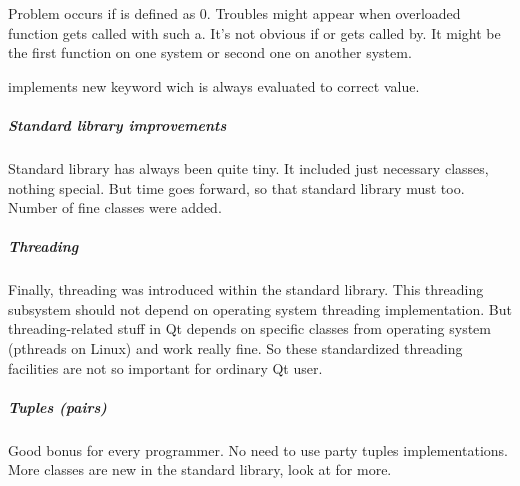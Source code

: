 Problem occurs if is defined as $0$. Troubles might appear when overloaded function gets called with such a. It's not obvious if or gets called by. It might be the first function on one system or second one on another system.

 implements new keyword wich is always evaluated to correct value.

\subparagraph{Standard library improvements}
Standard library has always been quite tiny. It included just necessary classes, nothing special. But time goes forward, so that standard library must too. Number of fine classes were added.

\subparagraph*{Threading}
Finally, threading was introduced within the standard library. This threading subsystem should not depend on operating system threading implementation. But threading-related stuff in Qt depends on specific classes from operating system (pthreads on Linux) and work really fine. So these standardized threading facilities are not so important for ordinary Qt user.

\subparagraph*{Tuples (pairs)}
Good bonus for every \cpp programmer. No need to use  party tuples implementations. More classes are new in the standard library, look at \citep{various:cppstandard} for more.

